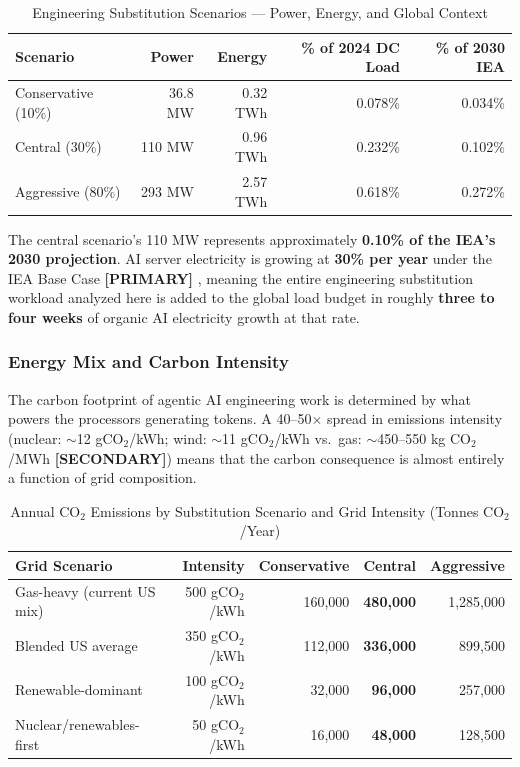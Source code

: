 \documentclass{article}
\newcommand{\PRIMARY}{\textbf{[PRIMARY]}}
\newcommand{\SECONDARY}{\textbf{[SECONDARY]}}
\begin{document}
\begin{table}[ht]
\centering
\caption{Engineering Substitution Scenarios --- Power, Energy, and Global Context}
\label{tab:power-global}
\small
\begin{tabular}{@{}lrrrr@{}}
\toprule
\textbf{Scenario} & \textbf{Power} & \textbf{Energy} & \textbf{\% of 2024 DC Load} & \textbf{\% of 2030 IEA} \\
\midrule
Conservative (10\%) & 36.8 MW & 0.32 TWh & 0.078\% & 0.034\% \\
Central (30\%) & 110 MW & 0.96 TWh & 0.232\% & 0.102\% \\
Aggressive (80\%) & 293 MW & 2.57 TWh & 0.618\% & 0.272\% \\
\bottomrule
\end{tabular}
\end{table}

The central scenario's 110 MW represents approximately \textbf{0.10\% of the IEA's 2030
projection}. AI server electricity is growing at \textbf{30\% per year} under the IEA
Base Case \PRIMARY{} \citep{iea2024energy}, meaning the entire engineering substitution workload analyzed here
is added to the global load budget in roughly \textbf{three to four weeks} of organic AI
electricity growth at that rate.

\subsubsection{Energy Mix and Carbon Intensity}

The carbon footprint of agentic AI engineering work is determined by what powers the
processors generating tokens. A 40--50$\times$ spread in emissions intensity (nuclear:
$\sim$12 gCO$_2$/kWh; wind: $\sim$11 gCO$_2$/kWh vs.\ gas: $\sim$450--550 kg
CO$_2$/MWh \SECONDARY{}) means that the carbon consequence is almost entirely a function
of grid composition.

\begin{table}[ht]
\centering
\caption{Annual CO$_2$ Emissions by Substitution Scenario and Grid Intensity (Tonnes CO$_2$/Year)}
\label{tab:carbon}
\small
\begin{tabular}{@{}lrrrr@{}}
\toprule
\textbf{Grid Scenario} & \textbf{Intensity} & \textbf{Conservative} & \textbf{Central} & \textbf{Aggressive} \\
\midrule
Gas-heavy (current US mix) & 500 gCO$_2$/kWh & 160,000 & \textbf{480,000} & 1,285,000 \\
Blended US average & 350 gCO$_2$/kWh & 112,000 & \textbf{336,000} & 899,500 \\
Renewable-dominant & 100 gCO$_2$/kWh & 32,000 & \textbf{96,000} & 257,000 \\
Nuclear/renewables-first & 50 gCO$_2$/kWh & 16,000 & \textbf{48,000} & 128,500 \\
\bottomrule
\end{tabular}
\end{table}
\end{document}
